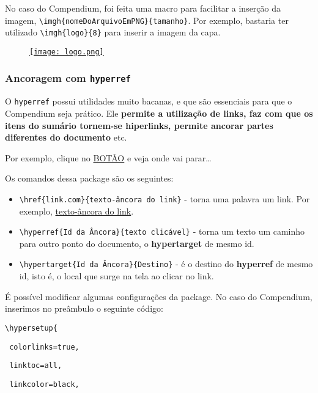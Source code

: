 \documentclass[12pt,a4paper]{article}
\begin{document}
No caso do Compendium, foi feita uma macro para facilitar a inserção da imagem, \texttt{\textbackslash imgh\{nomeDoArquivoEmPNG\}\{tamanho\}}. Por exemplo, bastaria ter utilizado \texttt{\textbackslash imgh\{logo\}\{8\}} para inserir a imagem da capa.

\begin{figure}[h]
\centering
\href{http://desciclopedia.org/wiki/Instituto_Militar_de_Engenharia}{\texttt{[image: logo.png]}}
\end{figure}

\subsubsection{Ancoragem com \texttt{hyperref}}

O \texttt{hyperref} possui utilidades muito bacanas, e que são essenciais para que o Compendium seja \hypertarget{ops}{prático}. Ele \textbf{permite a utilização de links, faz com que os itens do sumário tornem-se hiperlinks, permite ancorar partes diferentes do documento} etc.

Por exemplo, clique no \hyperlink{botao}{BOTÃO} e veja onde vai parar\dots

Os comandos dessa package são os seguintes:

\begin{itemize}
\item \texttt{\textbackslash href\{link.com\}\{texto-âncora do link\}} - torna uma palavra um link. Por exemplo, \href{google.com}{texto-âncora do link}.

\item \texttt{\textbackslash hyperref\{Id da Âncora\}\{texto clicável\}} - torna um texto um caminho para outro ponto do documento, o \textbf{hypertarget} de mesmo id.

\item \texttt{\textbackslash hypertarget\{Id da Âncora\}\{Destino\}} - é o destino do \textbf{hyperref} de mesmo id, isto é, o local que surge na tela ao clicar no link.
\end{itemize}

É possível modificar algumas configurações da package. No caso do Compendium, inserimos no preâmbulo o seguinte código:

\noindent\texttt{\textbackslash hypersetup\{}

\texttt{    colorlinks=true, }
    
\texttt{    linktoc=all,}
    
\texttt{    linkcolor=black,}
    
\end{document}
